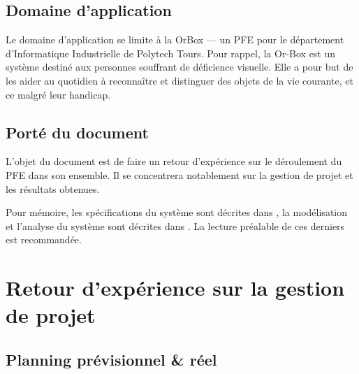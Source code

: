 \documentclass[a4paper]{report}
\begin{document}
    \section{Domaine d'application}
    
    Le domaine d’application se limite à la OrBox --- un PFE pour le département d'Informatique Industrielle de Polytech Tours.
    Pour rappel, la Or-Box est un système destiné aux personnes souffrant de déficience visuelle.
    Elle a pour but de les aider au quotidien à reconnaître et distinguer des objets de la vie courante, et ce malgré leur handicap.
    
    \section{Porté du document}
    
    L’objet du document est de faire un retour d'expérience sur le déroulement du PFE dans son ensemble.
    Il se concentrera notablement sur la gestion de projet et les résultats obtenues.
    
    Pour mémoire, les spécifications du système sont décrites dans \cite{OBCdS}, la modélisation et l'analyse du système sont décrites dans \cite{OBMod}. La lecture préalable de ces derniers est recommandée.
    
\chapter{Retour d'expérience sur la gestion de projet}
\section{Planning prévisionnel \& réel}
\end{document}
